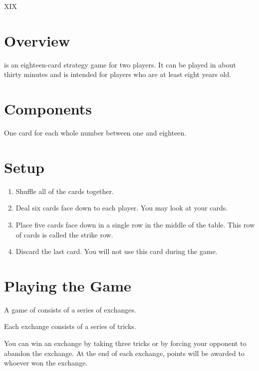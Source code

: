 \documentclass[a6paper, parskip=half, DIV=14, 10pt]{scrartcl}
\newcommand{\textRN}[1]{{\setmainfont{Roboto Slab} \RomanNumeral{#1}}}
\begin{document}
{%
\setmainfont[Scale=5.0]{Roboto Slab}
\Huge
\phantom{a}
\vfill{}
\begin{center}
XIX
\vfill
\phantom{a}
\end{center}
}%
\newpage
\setmainfont{Roboto}%
\raggedright%
\section*{Overview}
\textRN{19} is an eighteen-card strategy game for two players. It can be played in about thirty minutes and is intended for players who are at least eight years old.

\section*{Components}
\begin{description}[leftmargin=0pt, labelsep=\widthof{\ }]
	\item[Numbered Cards (18) \textendash] One card for each whole number between one and eighteen.
\end{description}

\section*{Setup}
\begin{enumerate}[leftmargin=*]
	\item Shuffle all of the cards together. 
	\item Deal six cards face down to each player. You may look at your cards.
	\item Place five cards face down in a single row in the middle of the table. This row of cards is called the strike row.
	\item Discard the last card. You will not use this card during the game.
\end{enumerate}

\newpage

\section*{Playing the Game}
A game of \textRN{19} consists of a series of exchanges.

Each exchange consists of a series of tricks.

You can win an exchange by taking three tricks or by forcing your opponent to abandon the exchange. At the end of each exchange, points will be awarded to whoever won the exchange.
\end{document}
